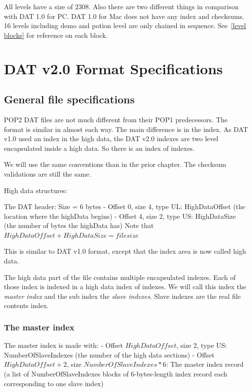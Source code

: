 \documentclass{article}
\begin{document}
  All levels have a size of 2308. Also there are two different things 
  in comparison with DAT 1.0 for PC. DAT 1.0 for  Mac does not have 
  any index and checksums. 16 levels including demo and potion level
  are only chained in sequence. See~\ref{level blocks} for reference on each block.

\pagebreak[3]
\section{DAT v2.0 Format Specifications}

\subsection{General file specifications}
 POP2 DAT files are not much different from their POP1 predecessors.
 The format is similar in almost each way. The main difference is in the
 index. As DAT v1.0 used an index in the high data, the DAT v2.0 indexes
 are two level encapsulated inside a high data. So there is an index of
 indexes.

 We will use the same conventions than in the prior chapter.
 The checksum validations are still the same.

 High data structures:

 The DAT header: Size = 6 bytes
  - Offset 0, size 4, type UL: HighDataOffset
           (the location where the highData begins)
  - Offset 4, size 2, type US: HighDataSize
           (the number of bytes the highData has)
           Note that $HighDataOffset+HighDataSize=file size$

 This is similar to DAT v1.0 format, except that the index area is now
 called high data.

 The high data part of the file contains multiple encapsulated indexes.
 Each of those index is indexed in a high data index of indexes. We will
 call this index the  {\it master index} and the sub index the  {\it slave indexes}.
 Slave indexes are the real file contents index.

\subsubsection{The master index} %
 The master index is made with:
  - Offset $HighDataOffset$,   size 2, type US: NumberOfSlaveIndexes
           (the number of the high data sections)
  - Offset $HighDataOffset+2$, size $NumberOfSlaveIndexes*6$: The master index
           record (a list of NumberOfSlaveIndexes blocks of 6-bytes-length
           index record each corresponding to one slave index)
\end{document}
